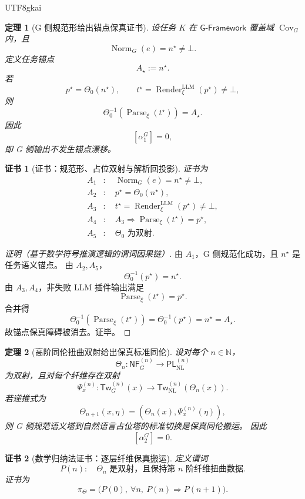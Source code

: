 \documentclass[12pt]{article}
\newtheorem{theorem}{定理}[section]
\newtheorem{Certificate}{证书}[section]
\newcommand{\NN}{\mathbb{N}}
\newcommand{\GFramework}{\textsf{G-Framework}}
\newcommand{\Norm}{\operatorname{Norm}}
\newcommand{\Render}{\operatorname{Render}}
\newcommand{\Parse}{\operatorname{Parse}}
\begin{document}
\begin{CJK*}{UTF8}{gkai}
\begin{theorem}[G 侧规范形给出锚点保真证书]
\label{thm:tex51-g-anchor-preservation}
设任务 \(K\) 在 \(\GFramework\) 覆盖域 \(\operatorname{Cov}_G\) 内，且
\[
  \Norm_G(e)=n^\star\ne\bot.
\]
定义任务锚点
\[
  A_\star:=n^\star.
\]
若
\[
  p^\star=\Theta_0(n^\star),
  \qquad
  t^\star=\Render_\xi^{\mathrm{LLM}}(p^\star)\ne\bot,
\]
则
\[
  \Theta_0^{-1}(\Parse_\xi(t^\star))=A_\star.
\]
因此
\[
  [\alpha_1^G]=0,
\]
即 G 侧输出不发生锚点漂移。
\end{theorem}

\begin{Certificate}[证书：规范形、占位双射与解析回投影]
\label{cert:tex51-g-anchor-preservation}
证书为
\[
\begin{aligned}
  A_1&:\quad \Norm_G(e)=n^\star\ne\bot,\\
  A_2&:\quad p^\star=\Theta_0(n^\star),\\
  A_3&:\quad t^\star=\Render_\xi^{\mathrm{LLM}}(p^\star)\ne\bot,\\
  A_4&:\quad A_3\Rightarrow \Parse_\xi(t^\star)=p^\star,\\
  A_5&:\quad \Theta_0\text{ 为双射}.
\end{aligned}
\]
\end{Certificate}

\begin{proof}[证明（基于数学符号推演逻辑的谓词因果链）]
由 \(A_1\)，G 侧规范化成功，且 \(n^\star\) 是任务语义锚点。
由 \(A_2,A_5\)，
\[
  \Theta_0^{-1}(p^\star)=n^\star.
\]
由 \(A_3,A_4\)，非失败 LLM 插件输出满足
\[
  \Parse_\xi(t^\star)=p^\star.
\]
合并得
\[
  \Theta_0^{-1}(\Parse_\xi(t^\star))
  =
  \Theta_0^{-1}(p^\star)
  =
  n^\star
  =
  A_\star.
\]
故锚点保真障碍被消去。证毕。
\end{proof}

\begin{theorem}[高阶同伦扭曲双射给出保真标准同伦]
\label{thm:tex51-g-faithful-homotopy}
设对每个 \(n\in\NN\)，
\[
  \Theta_n:\mathsf{NF}_G^{(n)}\to\mathsf{PL}_{\mathrm{NL}}^{(n)}
\]
为双射，且对每个纤维存在双射
\[
  \Psi_x^{(n)}:
  \mathsf{Tw}_G^{(n)}(x)
  \to
  \mathsf{Tw}_{\mathrm{NL}}^{(n)}(\Theta_n(x)).
\]
若递推式为
\[
  \Theta_{n+1}(x,\eta)
  =
  (\Theta_n(x),\Psi_x^{(n)}(\eta)),
\]
则 G 侧规范语义塔到自然语言占位塔的标准切换是保真同伦搬运。
因此
\[
  [\alpha_2^G]=0.
\]
\end{theorem}

\begin{Certificate}[数学归纳法证书：逐层纤维保真搬运]
\label{cert:tex51-g-faithful-homotopy}
定义谓词
\[
  P(n):\quad
  \Theta_n\text{ 是双射，且保持第 }n\text{ 阶纤维扭曲数据}.
\]
证书为
\[
  \pi_\Theta
  =
  \bigl(P(0),\ \forall n,\ P(n)\Rightarrow P(n+1)\bigr).
\]
\end{Certificate}


\end{CJK*}
\end{document}
